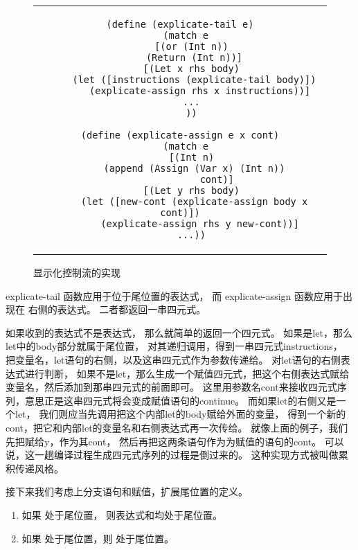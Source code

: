 \begin{figure}[t]
\begin{center}
\vspace{0.4em}
\begin{tabular}{c}
\begin{lstlisting}
(define (explicate-tail e)
  (match e
    [(or (Int n))
     (Return (Int n))]
    [(Let x rhs body)
     (let ([instructions (explicate-tail body)])
       (explicate-assign rhs x instructions))]
    ...
    ))

(define (explicate-assign e x cont)
  (match e
    [(Int n)
     (append (Assign (Var x) (Int n))
             cont)]
    [(Let y rhs body)
     (let ([new-cont (explicate-assign body x cont)])
       (explicate-assign rhs y new-cont))]
    ...))
\end{lstlisting}
\end{tabular}
\vspace{0.8em}
\end{center}

    \caption{显示化控制流的实现}
    \label{fig:explicate-control-implementation}
\end{figure}


explicate-tail 函数应用于位于尾位置的表达式，
而 explicate-assign 函数应用于出现在  右侧的表达式。
二者都返回一串四元式。

如果收到的表达式不是表达式，
那么就简单的返回一个四元式。
如果是let，那么let中的body部分就属于尾位置，
对其递归调用，得到一串四元式instructions，
把变量名，let语句的右侧，以及这串四元式作为参数传递给。
对let语句的右侧表达式进行判断，
如果不是let，那么生成一个赋值四元式，把这个右侧表达式赋给变量名，然后添加到那串四元式的前面即可。
这里用参数名cont来接收四元式序列，意思正是这串四元式将会变成赋值语句的continue。
而如果let的右侧又是一个let，
我们则应当先调用把这个内部let的body赋给外面的变量，
得到一个新的cont，把它和内部let的变量名和右侧表达式再一次传给。
就像上面的例子，我们先把赋给y，作为其cont，
然后再把这两条语句作为为赋值的语句的cont。
可以说，这一趟编译过程生成四元式序列的过程是倒过来的。
这种实现方式被叫做累积传递风格。

接下来我们考虑上分支语句和赋值，扩展尾位置的定义。
\begin{enumerate}
\item 如果  处于尾位置，
  则表达式和均处于尾位置。
\item 如果 处于尾位置，则 处于尾位置。
\end{enumerate}

